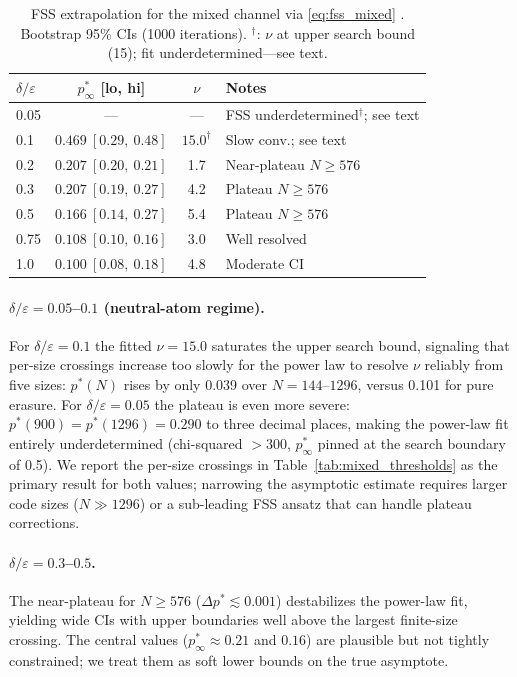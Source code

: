 \documentclass[a4paper]{quantumarticle}
\begin{document}
\begin{table}[h]
\centering
\caption{FSS extrapolation for the mixed channel via \eqref{eq:fss_mixed}
\cite{dennis2002topological}.
Bootstrap 95\% CIs (1000 iterations).
$^\dagger$: $\nu$ at upper search bound (15); fit underdetermined---see text.}
\label{tab:mixed_fss}
\setlength{\tabcolsep}{4pt}
\footnotesize
\begin{tabular}{lccp{2.8cm}}
\toprule
$\delta/\varepsilon$ & $p^*_\infty$ [lo, hi] & $\nu$ & Notes \\
\midrule
0.05 & ---                    & ---              & FSS underdetermined$^\dagger$; see text \\
0.1  & $0.469\ [0.29,\ 0.48]$ & $15.0^{\dagger}$ & Slow conv.; see text \\
0.2  & $0.207\ [0.20,\ 0.21]$ & 1.7              & Near-plateau $N \geq 576$ \\
0.3  & $0.207\ [0.19,\ 0.27]$ & 4.2              & Plateau $N \geq 576$ \\
0.5  & $0.166\ [0.14,\ 0.27]$ & 5.4              & Plateau $N \geq 576$ \\
0.75 & $0.108\ [0.10,\ 0.16]$ & 3.0              & Well resolved \\
1.0  & $0.100\ [0.08,\ 0.18]$ & 4.8              & Moderate CI \\
\bottomrule
\end{tabular}
\end{table}

\paragraph{$\delta/\varepsilon = 0.05$--$0.1$ (neutral-atom regime).}
For $\delta/\varepsilon = 0.1$ the fitted $\nu = 15.0$ saturates the upper search bound,
signaling that per-size crossings increase too slowly for the power law to resolve $\nu$
reliably from five sizes: $p^*(N)$ rises by only 0.039 over $N = 144$--$1296$, versus 0.101
for pure erasure.
For $\delta/\varepsilon = 0.05$ the plateau is even more severe: $p^*(900) = p^*(1296) = 0.290$
to three decimal places, making the power-law fit entirely underdetermined
(chi-squared $> 300$, $p^*_\infty$ pinned at the search boundary of 0.5).
We report the per-size crossings in Table~\ref{tab:mixed_thresholds} as the primary result
for both values; narrowing the asymptotic estimate requires larger code sizes
($N \gg 1296$) or a sub-leading FSS ansatz that can handle plateau corrections.

\paragraph{$\delta/\varepsilon = 0.3$--$0.5$.}
The near-plateau for $N \geq 576$ ($\Delta p^* \lesssim 0.001$) destabilizes the
power-law fit, yielding wide CIs with upper boundaries well above the largest finite-size
crossing.
The central values ($p^*_\infty \approx 0.21$ and $0.16$) are plausible but not
tightly constrained; we treat them as soft lower bounds on the true asymptote.
\end{document}
